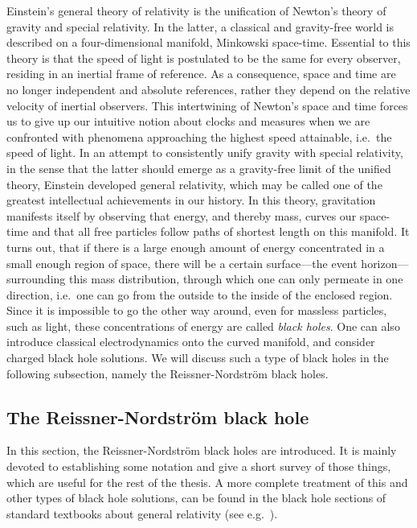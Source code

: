 \documentclass[12pt,twoside]{book}
\begin{document}
Einstein's general theory of relativity is the unification of Newton's theory of gravity and special relativity. In the latter, a classical and gravity-free world is described on a four-dimensional manifold, Minkowski space-time. Essential to this theory is that the speed of light is postulated to be the same for every observer, residing in an inertial frame of reference. As a consequence, space and time are no longer independent and absolute references, rather they depend on the relative velocity of inertial observers. This intertwining of Newton's space and time forces us to give up our intuitive notion about clocks and measures when we are confronted with phenomena approaching the highest speed attainable, i.e.\ the speed of light. In an attempt to consistently unify gravity with special relativity, in the sense that the latter should emerge as a gravity-free limit of the unified theory, Einstein developed general relativity, which may be called one of the greatest intellectual achievements in our history. In this theory, gravitation manifests itself by observing that energy, and thereby mass, curves our space-time and that all free particles follow paths of  shortest length on this manifold.  It turns out, that if there is a large enough amount of energy concentrated in a small enough region of space, there will be a certain surface---the event horizon---surrounding this mass distribution, through which one can only permeate in one direction, i.e.\ one can go from the outside to the inside of the enclosed region. Since it is impossible to go the other way around, even for massless particles, such as light, these concentrations of energy are called \emph{black holes}. One can also introduce classical electrodynamics onto the curved manifold, and consider charged black hole solutions. We will discuss such a type of black holes in the following subsection, namely the Reissner-Nordstr\"om black holes.


\subsection{The Reissner-Nordstr\"om black hole}
\label{subsec:RN-BH}

In this section, the Reissner-Nordstr\"om black holes are introduced. It is mainly devoted to establishing some notation and give a short survey of those things, which are useful for the rest of the thesis. A more complete treatment of this and other types of black hole solutions, can be found in the black hole sections of standard textbooks about general relativity (see e.g.\ \cite{bk:hobson,Ortin:gravity,Wald:1984rg}).\newline
\end{document}
